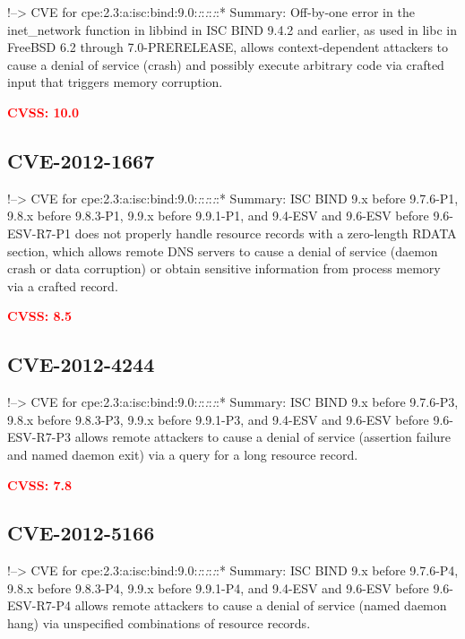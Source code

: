 \documentclass[a4paper, 12pt]{article}
\begin{document}
!--\textgreater{} CVE for
cpe:2.3:a:isc:bind:9.0:\emph{:}:\emph{:}:\emph{:}:* Summary: Off-by-one
error in the inet\_network function in libbind in ISC BIND 9.4.2 and
earlier, as used in libc in FreeBSD 6.2 through 7.0-PRERELEASE, allows
context-dependent attackers to cause a denial of service (crash) and
possibly execute arbitrary code via crafted input that triggers memory
corruption.

\textbf{\textcolor{red}{CVSS: 10.0}}

\hypertarget{cve-2012-1667}{%
\subsection{CVE-2012-1667}\label{cve-2012-1667}}

!--\textgreater{} CVE for
cpe:2.3:a:isc:bind:9.0:\emph{:}:\emph{:}:\emph{:}:* Summary: ISC BIND
9.x before 9.7.6-P1, 9.8.x before 9.8.3-P1, 9.9.x before 9.9.1-P1, and
9.4-ESV and 9.6-ESV before 9.6-ESV-R7-P1 does not properly handle
resource records with a zero-length RDATA section, which allows remote
DNS servers to cause a denial of service (daemon crash or data
corruption) or obtain sensitive information from process memory via a
crafted record.

\textbf{\textcolor{red}{CVSS: 8.5}}

\hypertarget{cve-2012-4244}{%
\subsection{CVE-2012-4244}\label{cve-2012-4244}}

!--\textgreater{} CVE for
cpe:2.3:a:isc:bind:9.0:\emph{:}:\emph{:}:\emph{:}:* Summary: ISC BIND
9.x before 9.7.6-P3, 9.8.x before 9.8.3-P3, 9.9.x before 9.9.1-P3, and
9.4-ESV and 9.6-ESV before 9.6-ESV-R7-P3 allows remote attackers to
cause a denial of service (assertion failure and named daemon exit) via
a query for a long resource record.

\textbf{\textcolor{red}{CVSS: 7.8}}

\hypertarget{cve-2012-5166}{%
\subsection{CVE-2012-5166}\label{cve-2012-5166}}

!--\textgreater{} CVE for
cpe:2.3:a:isc:bind:9.0:\emph{:}:\emph{:}:\emph{:}:* Summary: ISC BIND
9.x before 9.7.6-P4, 9.8.x before 9.8.3-P4, 9.9.x before 9.9.1-P4, and
9.4-ESV and 9.6-ESV before 9.6-ESV-R7-P4 allows remote attackers to
cause a denial of service (named daemon hang) via unspecified
combinations of resource records.
\end{document}
